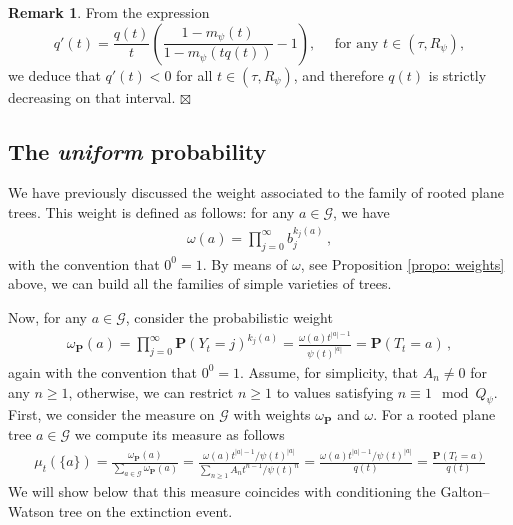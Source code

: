 \documentclass[11pt,a4paper,leqno]{amsart}
\theoremstyle{plain}
\theoremstyle{definition}
\newtheorem{remark}[theo]{Remark}
\def\finremark{	\hfill $\boxtimes$}
\numberwithin{equation}{section}
\def\P{\mathbf{P}}
\begin{document}
	\begin{remark}
		From the expression
		\[
		q'(t)
		=\frac{q(t)}{t}\!\left(\frac{1-m_{\psi}(t)}{1-m_{\psi}(tq(t))}-1\right), \quad \text{ for any } t \in (\tau,R_{\psi}),
		\]
		we deduce that \(q'(t)<0\) for all \(t\in(\tau,R_{\psi})\), and therefore $q(t)$ is strictly decreasing on that interval. %
		\finremark
	\end{remark}
	
	\smallskip
	
	\subsection{The \textit{uniform} probability}
	
	We have previously discussed the weight associated to the family of rooted plane trees. This weight  is defined as follows: for any \( a \in \mathcal{G} \), we have
	\begin{align*}
		\omega(a) = \prod_{j = 0}^{\infty}b_j^{k_j(a)}\,, 
	\end{align*}
	with the convention that \( 0^0 = 1 \). By means of $\omega$, see Proposition \ref{propo: weights} above, we can build all the families of simple varieties of trees.  
	\smallskip
	
	Now, for any $a \in \mathcal{G}$, consider the probabilistic weight  
	\begin{align*}
		\omega_{\P}(a) = \prod_{j=0}^{\infty}\P(Y_t = j)^{k_j(a)} = \frac{\omega(a)t^{|a|-1}}{\psi(t)^{|a|}} = \P(T_t = a)\,,
	\end{align*}
	again with the convention that \( 0^0 = 1 \). Assume, for simplicity, that \( A_n \neq 0 \) for any \( n \geq 1 \), otherwise, we can restrict \( n \geq 1 \) to values satisfying \( n \equiv 1 \mod Q_{\psi} \). First, we consider the measure on \( \mathcal{G} \) with weights \( \omega_{\P} \) and \( \omega \). For a rooted plane tree $a \in \mathcal{G}$ we compute its measure as follows
	\begin{align}\label{eq: Boltzmann/condition_extinction}
		\mu_{t}(\{a\}) = \frac{\omega_{\P}(a)}{\sum_{a \in \mathcal{G}}\omega_{\P}(a)} = \frac{\omega(a)t^{|a|-1}/\psi(t)^{|a|}}{\sum_{n \geq 1}A_n t^{n-1}/\psi(t)^n} = \frac{\omega(a)t^{|a|-1}/\psi(t)^{|a|}}{q(t)} = \frac{\P(T_t = a)}{q(t)}
	\end{align}
	We will show below that this measure coincides with conditioning the Galton–Watson tree on the extinction event. %
	\smallskip
	
\end{document}
